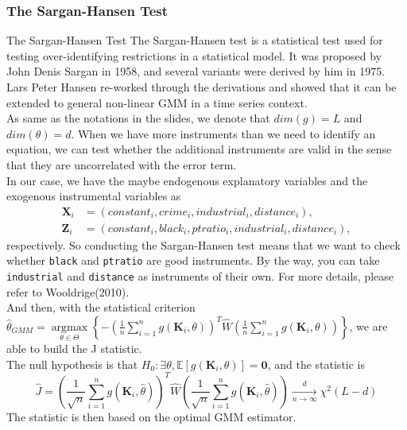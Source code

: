 \documentclass{article}
\theoremstyle{definition}
\newcommand{\limitd}{\mathop{\longrightarrow}\limits_{n \rightarrow \infty}^{d}}
\begin{document}
\subsubsection{The Sargan-Hansen Test}
\begin{itembox}[1]{The Sargan-Hansen Test}
The Sargan-Hansen test is a statistical test used for testing over-identifying restrictions in a statistical model. It was proposed by John Denis Sargan in 1958\cite{Sargan1958}, and several variants were derived by him in 1975\cite{Sargan1988}. Lars Peter Hansen re-worked through the derivations and showed that it can be extended to general non-linear GMM in a time series context\cite{Hansen1982}.\\
As same as the notations in the slides, we denote that $dim(g) = L$ and $dim(\theta) = d$. When we have more instruments than we need to identify an equation, we can test whether the additional instruments are valid in the sense that they are uncorrelated with the error term. \\
In our case, we have the maybe endogenous explanatory variables and the exogenous instrumental variables as\\
\begin{align*}
	\textbf{X}_i & = (constant_i, crime_i, industrial_i, distance_i),\\
	\textbf{Z}_i & = (constant_i, black_i, ptratio_i, industrial_i, distance_i),
\end{align*}
respectively. So conducting the Sargan-Hansen test means that we want to check whether \texttt{black} and \texttt{ptratio} are good instruments. By the way, you can take \texttt{industrial} and \texttt{distance} as instruments of their own. For more details, please refer to Wooldrige(2010)\cite{JMW10}.\\ 
And then, with the statistical criterion $\hat{\theta}_{GMM} = \mathop{arg max}\limits_{\theta \in \Theta}\left\{- (\frac{1}{n}\sum_{i =1}^{n}g(\textbf{K}_i, \theta) )^T \widehat{W} (\frac{1}{n}\sum_{i =1}^{n}g(\textbf{K}_i, \theta) )\right\}$, we are able to build the J statistic.\\
The null hypothesis is that $H_0: \exists \theta, \mathbb{E}[g(\textbf{K}_i, \theta) ] = \textbf{0}$, and the statistic is\\
\begin{equation*}
	\hat{J} = (\frac{1}{\sqrt{n}}\sum_{i =1}^{n}g(\textbf{K}_i, \hat{\theta}) )^T \widehat{W} (\frac{1}{\sqrt{n}}\sum_{i =1}^{n}g(\textbf{K}_i, \hat{\theta}) ) \limitd \chi^2 (L - d)
\end{equation*}	
The statistic is then based on the optimal GMM estimator.
\end{itembox}
\end{document}
